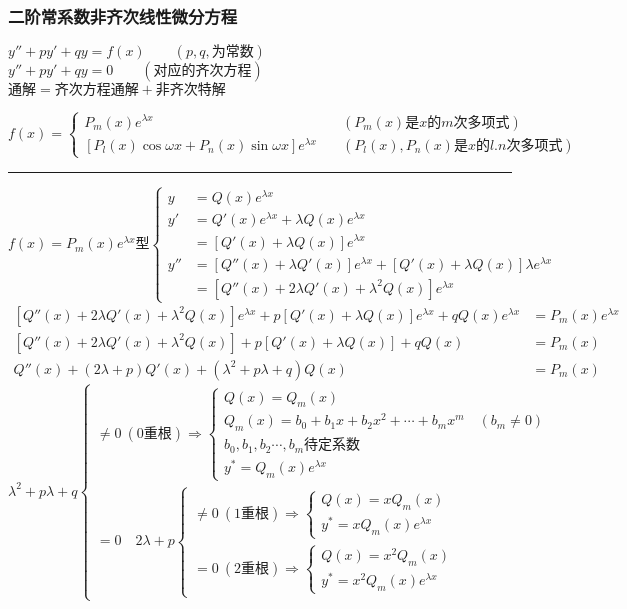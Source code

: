 \subsubsection{二阶常系数非齐次线性微分方程}
\begin{center}
	$y''+py'+qy=f(x)\qquad(p,q,\mbox{为常数})$\\
	$y''+py'+qy=0\qquad (\mbox{对应的齐次方程})$\\
	$\mbox{通解} =\mbox{齐次方程通解}+\mbox{非齐次特解}$
\end{center}
	$$f(x)=\begin{cases}
		P_m(x)e^{\lambda x}&(P_m(x)\mbox{是$x$的$m$次多项式})\\
		\left[P_l(x)\cos\omega x+P_n(x)\sin\omega x\right]e^{\lambda x}\quad&(P_l(x),P_n(x)\mbox{是$x$的$l.n$次多项式})
	\end{cases}$$
\noindent\rule[\fill]{\textwidth}{0.4pt}
	$$f(x)=P_m(x)e^{\lambda x}\mbox{型}\begin{cases}
		y&=Q(x)e^{\lambda x}\\
		y'&=Q'(x)e^{\lambda x}+\lambda Q(x)e^{\lambda x}\\
		&=\left[Q'(x)+\lambda Q(x)\right]e^{\lambda x}\\
		y''&=\left[Q''(x)+\lambda Q'(x)\right]e^{\lambda x}+\left[Q'(x)+\lambda Q(x)\right]\lambda e^{\lambda x}\\
		&=\left[Q''(x)+2\lambda Q'(x)+\lambda^2Q(x)\right]e^{\lambda x}
	\end{cases}$$
\begin{align*}
	\left[Q''(x)+2\lambda Q'(x)+\lambda^2Q(x)\right]e^{\lambda x}+p\left[Q'(x)+\lambda Q(x)\right]e^{\lambda x}+qQ(x)e^{\lambda x}&=P_m(x)e^{\lambda x}\\
	\left[Q''(x)+2\lambda Q'(x)+\lambda^2Q(x)\right]+p\left[Q'(x)+\lambda Q(x)\right]+qQ(x)&=P_m(x)\\
	Q''(x)+(2\lambda+p)Q'(x)+(\lambda^2+p\lambda+q)Q(x)&=P_m(x)
\end{align*}
$$\lambda^2+p\lambda+q\begin{cases}
	\neq 0\ (0\mbox{重根})\Rightarrow\begin{cases}
	 	Q(x)=Q_m(x)\\
	 	Q_m(x)=b_0+b_1x+b_2x^2+\cdots+b_mx^m\quad(b_m\neq 0)\\
	 	b_0,b_1,b_2\cdots,b_m\mbox{待定系数}\\
	 	y^*=Q_m(x)e^{\lambda x}
	 \end{cases}\\
 	=0\quad 2\lambda+p\begin{cases}
 		\neq 0\ (1\mbox{重根})\Rightarrow\begin{cases}
 			Q(x)=xQ_m(x)\\
 			y^*=xQ_m(x)e^{\lambda x}
 		\end{cases}\\
 	= 0\ (2\mbox{重根})\Rightarrow\begin{cases}
 			Q(x)=x^2Q_m(x)\\
 			y^*=x^2Q_m(x)e^{\lambda x}
 		\end{cases}
 	\end{cases}
\end{cases}$$
